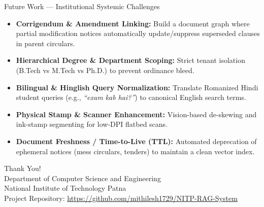 \documentclass[11pt]{beamer}
\begin{document}
\begin{frame}{Future Work --- Institutional Systemic Challenges}
    \begin{itemize}
        \item \textbf{Corrigendum \& Amendment Linking:} Build a document graph where partial modification notices automatically update/suppress superseded clauses in parent circulars.
        \vspace{3pt}
        \item \textbf{Hierarchical Degree \& Department Scoping:} Strict tenant isolation (B.Tech vs M.Tech vs Ph.D.) to prevent ordinance bleed.
        \vspace{3pt}
        \item \textbf{Bilingual \& Hinglish Query Normalization:} Translate Romanized Hindi student queries (e.g., \textit{``exam kab hai?''}) to canonical English search terms.
        \vspace{3pt}
        \item \textbf{Physical Stamp \& Scanner Enhancement:} Vision-based de-skewing and ink-stamp segmenting for low-DPI flatbed scans.
        \vspace{3pt}
        \item \textbf{Document Freshness / Time-to-Live (TTL):} Automated deprecation of ephemeral notices (mess circulars, tenders) to maintain a clean vector index.
    \end{itemize}
\end{frame}

\begin{frame}
    \centering
    \Large Thank You!\\[15pt]
    \small Department of Computer Science and Engineering\\
    National Institute of Technology Patna\\[15pt]
    \footnotesize
    Project Repository: \url{https://github.com/mithilesh1729/NITP-RAG-System}
\end{frame}
\end{document}
